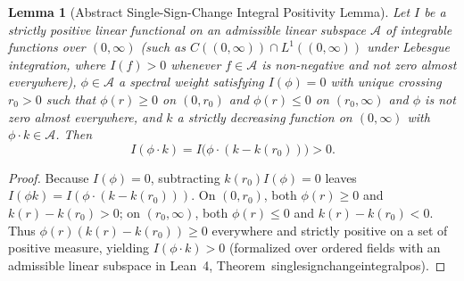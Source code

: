 \documentclass[twocolumn,10pt,amsmath,amssymb,floatfix]{revtex4-2}
\theoremstyle{plain}
\newtheorem{lemma}[theorem]{Lemma}
\theoremstyle{definition}
\newcommand{\leanid}[1]{{\footnotesize\ttfamily\def\_{\textunderscore\penalty0\hspace{0pt}}#1}}
\begin{document}
\begin{lemma}[Abstract Single-Sign-Change Integral Positivity Lemma]
\label{lem:ssc_positivity}
Let $I$ be a strictly positive linear functional on an admissible linear subspace $\mathcal{A}$ of integrable functions over $(0,\infty)$ (such as $C((0,\infty)) \cap L^1((0,\infty))$ under Lebesgue integration, where $I(f) > 0$ whenever $f \in \mathcal{A}$ is non-negative and not zero almost everywhere), $\phi \in \mathcal{A}$ a spectral weight satisfying $I(\phi) = 0$ with unique crossing $r_0 > 0$ such that $\phi(r) \ge 0$ on $(0, r_0)$ and $\phi(r) \le 0$ on $(r_0,\infty)$ and $\phi$ is not zero almost everywhere, and $k$ a strictly decreasing function on $(0,\infty)$ with $\phi \cdot k \in \mathcal{A}$. Then
\begin{equation}
I(\phi \cdot k) = I\big(\phi \cdot (k - k(r_0))\big) > 0.
\end{equation}
\end{lemma}
\begin{proof}
Because $I(\phi) = 0$, subtracting $k(r_0)I(\phi) = 0$ leaves $I(\phi k) = I(\phi\cdot(k - k(r_0)))$. On $(0, r_0)$, both $\phi(r) \ge 0$ and $k(r) - k(r_0) > 0$; on $(r_0,\infty)$, both $\phi(r) \le 0$ and $k(r) - k(r_0) < 0$. Thus $\phi(r)(k(r)-k(r_0)) \ge 0$ everywhere and strictly positive on a set of positive measure, yielding $I(\phi\cdot k) > 0$ (formalized over ordered fields with an admissible linear subspace in Lean~4, Theorem~\leanid{single\_sign\_change\_integral\_pos}).
\end{proof}
\end{document}
